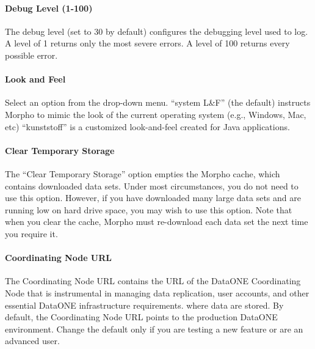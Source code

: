 \paragraph{Debug Level (1-100)} The debug level (set to 30 by default)
configures the debugging level used to log. A level of 1 returns only
the most severe errors. A level of 100 returns every possible error.

\paragraph{Look and Feel} Select an option from the drop-down menu.
``system L\&F'' (the default) instructs Morpho to mimic the look of the
current operating system (e.g., Windows, Mac, etc) ``kunststoff'' is a
customized look-and-feel created for Java applications.

\paragraph{Clear Temporary Storage} The ``Clear Temporary Storage''
option empties the Morpho cache, which contains downloaded data sets.
Under most circumstances, you do not need to use this option. However,
if you have downloaded many large data sets and are running low on hard
drive space, you may wish to use this option. Note that when you clear
the cache, Morpho must re-download each data set the next time you
require it.

\paragraph{Coordinating Node URL} The Coordinating Node URL contains the URL 
of the DataONE Coordinating Node that is instrumental in managing data replication, 
user accounts, and other essential DataONE infrastructure requirements.
where data are stored. By default, the Coordinating Node URL points to the
production DataONE environment. Change the default only if you are testing a new feature or 
are an advanced user.
